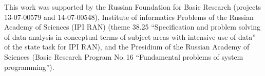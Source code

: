  \vspace*{1pt}



\vspace*{-12pt}


\Ack
\noindent
This work was supported by the Russian Foundation for Basic Research
(projects 13-07-00579 and 14-07-00548), Institute of informatics Problems
of the Russian Academy of Sciences (IPI RAN) (theme 38.25
``Specification and problem solving of data analysis in conceptual terms
of subject areas with intensive use of data''
of the state task for IPI RAN), and the Presidium of the Russian Academy
of Sciences (Basic Research Program No.\,16 ``Fundamental problems of
system programming'').


\vspace*{3pt}

